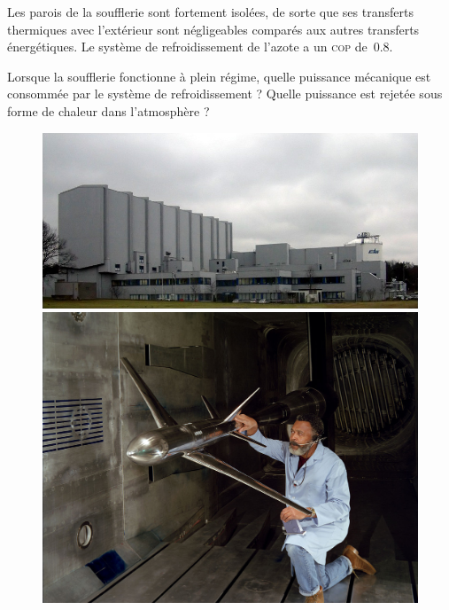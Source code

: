 	Les parois de la soufflerie sont fortement isolées, de sorte que ses transferts thermiques avec l’extérieur sont négligeables comparés aux autres transferts énergétiques. Le système de refroidissement de l’azote a un \textsc{cop} de~\num{0,8}. 
	
	Lorsque la soufflerie fonctionne à plein régime, quelle puissance mécanique est consommée par le système de refroidissement ? Quelle puissance est rejetée sous forme de chaleur dans l’atmosphère ?

	\begin{figure}[htp]
		\begin{center}
			\includegraphics[width=0.8\columnwidth]{images/etw.jpg}
			\includegraphics[width=0.8\columnwidth]{images/langley_transonic.jpg}
		\end{center}
		\label{fig_souffleries}
	\end{figure}

